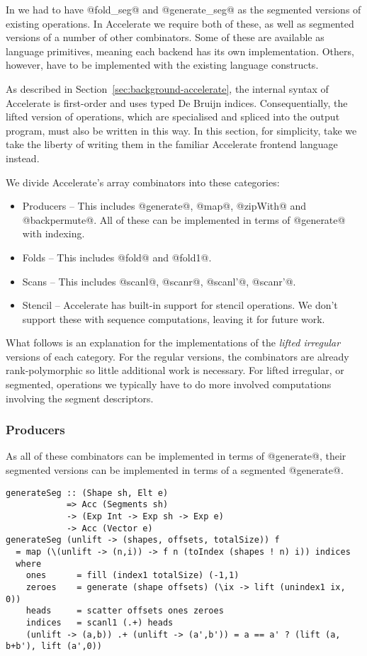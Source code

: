 In \ndp{} we had to have @fold_seg@ and @generate_seg@ as the segmented versions of existing operations. In Accelerate we require both of these, as well as segmented versions of a number of other combinators. Some of these are available as language primitives, meaning each backend has its own implementation. Others, however, have to be implemented with the existing language constructs.

As described in Section~\ref{sec:background-accelerate}, the internal syntax of Accelerate is first-order and uses typed De Bruijn indices. Consequentially, the lifted version of operations, which are specialised and spliced into the output program, must also be written in this way. In this section, for simplicity, take we take the liberty of writing them in the familiar Accelerate frontend language instead.

We divide Accelerate's array combinators into these categories:
%
\begin{itemize}
\item Producers -- This includes @generate@, @map@, @zipWith@ and @backpermute@. All of these can be implemented in terms of @generate@ with indexing.
\item Folds -- This includes @fold@ and @fold1@.
\item Scans -- This includes @scanl@, @scanr@, @scanl'@, @scanr'@.
\item Stencil -- Accelerate has built-in support for stencil operations. We don't support these with sequence computations, leaving it for future work.
\end{itemize}

What follows is an explanation for the implementations of the \emph{lifted irregular} versions of each category. For the regular versions, the combinators are already rank-polymorphic so little additional work is necessary. For lifted irregular, or segmented, operations we typically have to do more involved computations involving the segment descriptors.

\subsubsection{Producers}
As all of these combinators can be implemented in terms of @generate@, their segmented versions can be implemented in terms of a segmented @generate@.
%
\begin{lstlisting}
generateSeg :: (Shape sh, Elt e)
            => Acc (Segments sh)
            -> (Exp Int -> Exp sh -> Exp e)
            -> Acc (Vector e)
generateSeg (unlift -> (shapes, offsets, totalSize)) f
  = map (\(unlift -> (n,i)) -> f n (toIndex (shapes ! n) i)) indices
  where
    ones      = fill (index1 totalSize) (-1,1)
    zeroes    = generate (shape offsets) (\ix -> lift (unindex1 ix, 0))
    heads     = scatter offsets ones zeroes
    indices   = scanl1 (.+) heads
    (unlift -> (a,b)) .+ (unlift -> (a',b')) = a == a' ? (lift (a, b+b'), lift (a',0))
\end{lstlisting}
%

